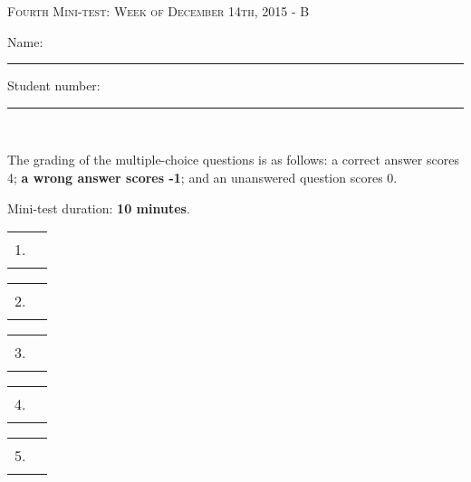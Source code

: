 \documentclass{docist}
\begin{document}
\thispagestyle{empty}

\begin{center}
  {\Large \textsc{Fourth Mini-test: Week of December 14th, 2015 - B\\[2ex]}}
  {\normalsize    Name: \rule{8cm}{1pt} Student number: \rule{2cm}{1pt}\\[2ex]}
\end{center}

The grading of the multiple-choice questions is as follows: a correct answer scores 4; \textbf{a wrong answer scores -1}; and an unanswered question scores 0. 

Mini-test duration: \textbf{10 minutes}. 

\begin{center}
%
  \begin{tabular}{rc}
    1. & \rule{1cm}{1pt} \\[2ex]
  \end{tabular}
  \hspace*{0.7cm}
  \begin{tabular}{rc}
    2. & \rule{1cm}{1pt} \\[2ex]
  \end{tabular}
  \hspace*{0.7cm}
  \begin{tabular}{rc}
    3. & \rule{1cm}{1pt} \\[2ex]
  \end{tabular}
  \hspace*{0.7cm}
  \begin{tabular}{rc}
    4. & \rule{1cm}{1pt} \\[2ex]
  \end{tabular}
  \hspace*{0.7cm}
  \begin{tabular}{rc}
    5. & \rule{1cm}{1pt} \\[2ex]
  \end{tabular}
\end{center}





\qInfinispanTwo


\qComponentAndConnectorThree


\qAllocationTwo


\qJenkinsTwo


\qMicroAndAmazonTwo
\end{document}
